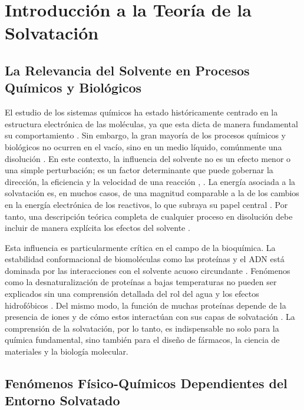 \chapter{Introducción a la Teoría de la Solvatación}

\section{La Relevancia del Solvente en Procesos Químicos y Biológicos}

El estudio de los sistemas químicos ha estado históricamente centrado en la estructura electrónica de las moléculas, ya que esta dicta de manera fundamental su comportamiento \cite[102]{hirata2003molecular}. Sin embargo, la gran mayoría de los procesos químicos y biológicos no ocurren en el vacío, sino en un medio líquido, comúnmente una disolución \cite[2]{canuto2010solvation}. En este contexto, la influencia del solvente no es un efecto menor o una simple perturbación; es un factor determinante que puede gobernar la dirección, la eficiencia y la velocidad de una reacción \cite[72]{hirata2003molecular}, \cite[4]{nishiyama2021molecular}. La energía asociada a la solvatación es, en muchos casos, de una magnitud comparable a la de los cambios en la energía electrónica de los reactivos, lo que subraya su papel central \cite[10]{hirata2003molecular}. Por tanto, una descripción teórica completa de cualquier proceso en disolución debe incluir de manera explícita los efectos del solvente \cite[1]{nishiyama2021molecular}.

Esta influencia es particularmente crítica en el campo de la bioquímica. La estabilidad conformacional de biomoléculas como las proteínas y el ADN está dominada por las interacciones con el solvente acuoso circundante \cite[6, 116]{hirata2003molecular}. Fenómenos como la desnaturalización de proteínas a bajas temperaturas no pueden ser explicados sin una comprensión detallada del rol del agua y los efectos hidrofóbicos \cite[12]{hirata2003molecular}. Del mismo modo, la función de muchas proteínas depende de la presencia de iones y de cómo estos interactúan con sus capas de solvatación \cite[2]{marcus2015ions}. La comprensión de la solvatación, por lo tanto, es indispensable no solo para la química fundamental, sino también para el diseño de fármacos, la ciencia de materiales y la biología molecular.

\section{Fenómenos Físico-Químicos Dependientes del Entorno Solvatado}

